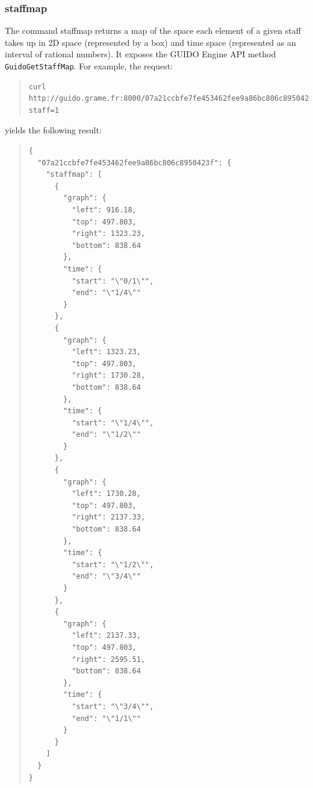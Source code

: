 \documentclass[a4paper]{article}
\begin{document}
\subsubsection{staffmap}
The command staffmap returns a map of the space each element of a given staff takes up in 2D space (represented by a box) and time space (represented as an interval of rational numbers).  It exposes the GUIDO Engine API method \verb=GuidoGetStaffMap=.  For example, the request:
\begin{quote}
\begingroup
\fontsize{7.5pt}{12pt}\selectfont
\begin{verbatim}
curl http://guido.grame.fr:8000/07a21ccbfe7fe453462fee9a86bc806c8950423f/staffmap?staff=1
\end{verbatim}
\endgroup
\end{quote}
yields the following result:
\begin{quote}
\begin{verbatim}
{
  "07a21ccbfe7fe453462fee9a86bc806c8950423f": {
    "staffmap": [
      {
        "graph": {
          "left": 916.18,
          "top": 497.803,
          "right": 1323.23,
          "bottom": 838.64
        },
        "time": {
          "start": "\"0/1\"",
          "end": "\"1/4\""
        }
      },
      {
        "graph": {
          "left": 1323.23,
          "top": 497.803,
          "right": 1730.28,
          "bottom": 838.64
        },
        "time": {
          "start": "\"1/4\"",
          "end": "\"1/2\""
        }
      },
      {
        "graph": {
          "left": 1730.28,
          "top": 497.803,
          "right": 2137.33,
          "bottom": 838.64
        },
        "time": {
          "start": "\"1/2\"",
          "end": "\"3/4\""
        }
      },
      {
        "graph": {
          "left": 2137.33,
          "top": 497.803,
          "right": 2595.51,
          "bottom": 838.64
        },
        "time": {
          "start": "\"3/4\"",
          "end": "\"1/1\""
        }
      }
    ]
  }
}
\end{verbatim}
\end{quote}
\end{document}
